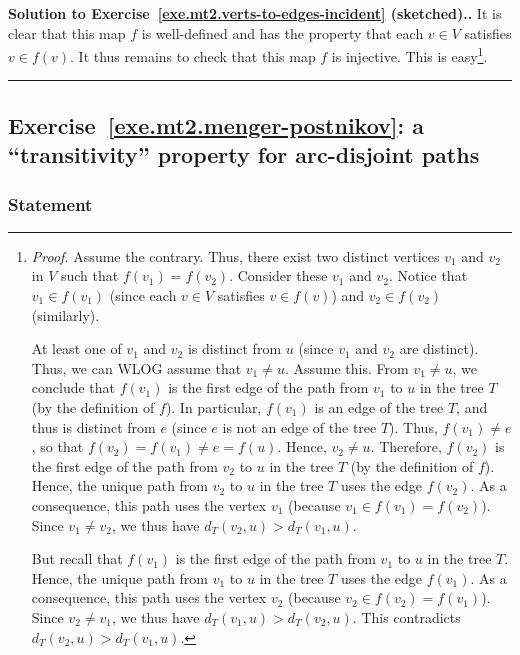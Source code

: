\documentclass[numbers=enddot,12pt,final,onecolumn,notitlepage]{scrartcl}%
\theoremstyle{definition}
\newenvironment{proof}[1][Proof]{\noindent\textbf{#1.} }{\ \rule{0.5em}{0.5em}}
\newcommand{\tup}[1]{\left( #1 \right)}
\begin{document}
\begin{proof}[Solution to
Exercise~\ref{exe.mt2.verts-to-edges-incident} (sketched).]
It is clear that this map $f$ is well-defined and has the property
that each $v \in V$ satisfies $v \in f\tup{v}$.
It thus remains to check that this map $f$ is injective.
This is easy\footnote{\textit{Proof.} Assume the contrary.
  Thus, there exist two distinct vertices $v_1$ and $v_2$ in $V$
  such that $f \tup{v_1} = f \tup{v_2}$.
  Consider these $v_1$ and $v_2$.
  Notice that $v_1 \in f \tup{v_1}$ (since each $v \in V$
  satisfies $v \in f\tup{v}$) and $v_2 \in f \tup{v_2}$
  (similarly).
  \par
  At least one of $v_1$ and $v_2$ is distinct from $u$ (since
  $v_1$ and $v_2$ are distinct).
  Thus, we can WLOG assume that $v_1 \neq u$.
  Assume this.
  From $v_1 \neq u$, we conclude that $f \tup{v_1}$ is the
  first edge of the path from $v_1$ to $u$ in the tree $T$
  (by the definition of $f$).
  In particular, $f \tup{v_1}$ is an edge of the tree $T$, and
  thus is distinct from $e$ (since $e$ is not an edge of the
  tree $T$).
  Thus, $f \tup{v_1} \neq e$, so that
  $f \tup{v_2} = f \tup{v_1} \neq e = f \tup{u}$.
  Hence, $v_2 \neq u$.
  Therefore, $f \tup{v_2}$ is the
  first edge of the path from $v_2$ to $u$ in the tree $T$
  (by the definition of $f$).
  Hence, the unique path from $v_2$ to $u$ in the tree $T$
  uses the edge $f \tup{v_2}$.
  As a consequence, this path uses the vertex $v_1$
  (because $v_1 \in f \tup{v_1} = f \tup{v_2}$).
  Since $v_1 \neq v_2$, we thus have
  $d_T \tup{v_2, u} > d_T \tup{v_1, u}$.
  \par
  But recall that $f \tup{v_1}$ is the
  first edge of the path from $v_1$ to $u$ in the tree $T$.
  Hence, the unique path from $v_1$ to $u$ in the tree $T$
  uses the edge $f \tup{v_1}$.
  As a consequence, this path uses the vertex $v_2$
  (because $v_2 \in f \tup{v_2} = f \tup{v_1}$).
  Since $v_2 \neq v_1$, we thus have
  $d_T \tup{v_1, u} > d_T \tup{v_2, u}$.
  This contradicts
  $d_T \tup{v_2, u} > d_T \tup{v_1, u}$.}.
\end{proof}

\subsection{Exercise~\ref{exe.mt2.menger-postnikov}:
a ``transitivity'' property for arc-disjoint paths}

\subsubsection{Statement}
\end{document}
